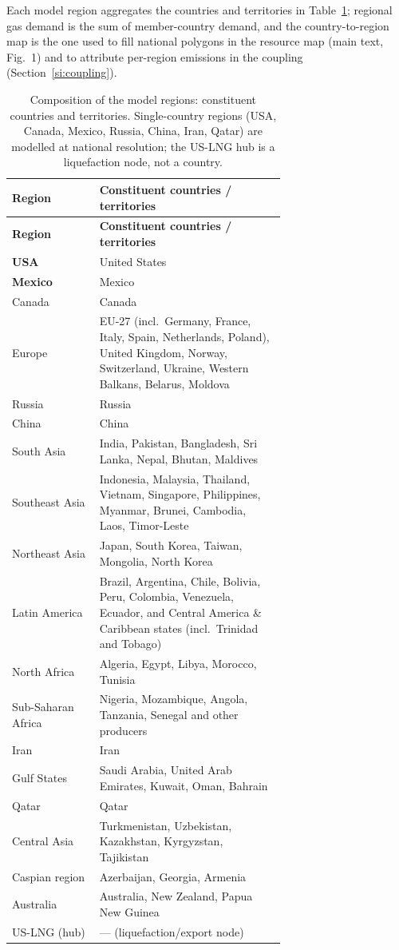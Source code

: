 \documentclass[11pt]{article}
\begin{document}
Each model region aggregates the countries and territories in
Table~\ref{tab:composition}; regional gas demand is the sum of member-country
demand, and the country-to-region map is the one used to fill national polygons
in the resource map (main text, Fig.~1) and to attribute per-region emissions
in the coupling (Section~\ref{si:coupling}).

\begin{longtable}{@{}lp{0.68\linewidth}@{}}
\caption{Composition of the model regions: constituent countries and
territories. Single-country regions (USA, Canada, Mexico, Russia, China, Iran,
Qatar) are modelled at national resolution; the US-LNG hub is a liquefaction
node, not a country.}\label{tab:composition}\\
\toprule
\textbf{Region} & \textbf{Constituent countries / territories} \\
\midrule
\endfirsthead
\toprule
\textbf{Region} & \textbf{Constituent countries / territories} \\
\midrule
\endhead
\textbf{USA}        & United States \\
\textbf{Mexico}     & Mexico \\
Canada             & Canada \\
Europe             & EU-27 (incl.\ Germany, France, Italy, Spain, Netherlands, Poland), United Kingdom, Norway, Switzerland, Ukraine, Western Balkans, Belarus, Moldova \\
Russia             & Russia \\
China              & China \\
South Asia         & India, Pakistan, Bangladesh, Sri Lanka, Nepal, Bhutan, Maldives \\
Southeast Asia     & Indonesia, Malaysia, Thailand, Vietnam, Singapore, Philippines, Myanmar, Brunei, Cambodia, Laos, Timor-Leste \\
Northeast Asia     & Japan, South Korea, Taiwan, Mongolia, North Korea \\
Latin America      & Brazil, Argentina, Chile, Bolivia, Peru, Colombia, Venezuela, Ecuador, and Central America \& Caribbean states (incl.\ Trinidad and Tobago) \\
North Africa       & Algeria, Egypt, Libya, Morocco, Tunisia \\
Sub-Saharan Africa & Nigeria, Mozambique, Angola, Tanzania, Senegal and other producers \\
Iran               & Iran \\
Gulf States        & Saudi Arabia, United Arab Emirates, Kuwait, Oman, Bahrain \\
Qatar              & Qatar \\
Central Asia       & Turkmenistan, Uzbekistan, Kazakhstan, Kyrgyzstan, Tajikistan \\
Caspian region     & Azerbaijan, Georgia, Armenia \\
Australia          & Australia, New Zealand, Papua New Guinea \\
US-LNG (hub)       & --- (liquefaction/export node) \\
\bottomrule
\end{longtable}
\end{document}
